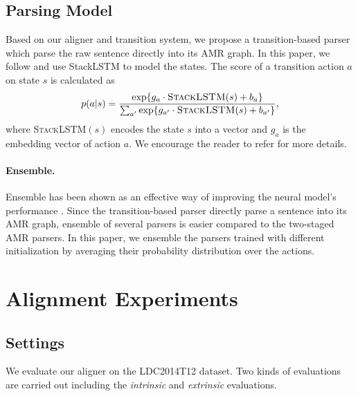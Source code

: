 \documentclass[11pt,a4paper]{article}
\begin{document}
\subsection{Parsing Model}\label{sec:parser}
Based on our aligner and transition system, we propose a transition-based parser
which parse the raw sentence directly into its AMR graph.
In this paper, we follow \citet{ballesteros-alonaizan:2017:EMNLP2017}
and use StackLSTM \cite{dyer-EtAl:2015:ACL-IJCNLP} to model the states.
The score of a transition action $a$ on state $s$ is calculated as
\[
p(a|s)=\frac{\exp\{g_a\cdot \textsc{StackLSTM}(s) + b_a\}}{\sum_{a'}\exp\{g_{a'}\cdot \textsc{StackLSTM}(s) + b_{a'}\}}\text{,}
\]
where \textsc{StackLSTM}$(s)$ encodes the state $s$ into a vector
and $g_a$ is the embedding vector of action $a$.
We encourage the reader to refer \citet{ballesteros-alonaizan:2017:EMNLP2017}
for more details.

\paragraph{Ensemble.}
Ensemble has been shown as an effective way of improving the neural model's performance \cite{he-EtAl:2017:Long3}.
Since the transition-based parser directly parse a sentence into its AMR graph,
ensemble of several parsers is easier compared to the two-staged AMR parsers.
In this paper, we ensemble the parsers trained with different initialization
by averaging their probability distribution over the actions.

\section{Alignment Experiments}\label{sec:align-exp}

\subsection{Settings}

We evaluate our aligner on the LDC2014T12 dataset.
Two kinds of evaluations are carried out including the {\it intrinsic} and {\it extrinsic} evaluations.
\end{document}

